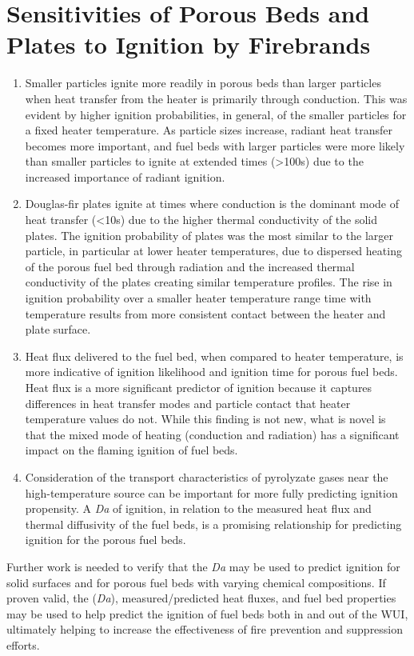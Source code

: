 \section{Sensitivities of Porous Beds and Plates to Ignition by Firebrands}
        \begin{enumerate}
            \item 
                Smaller particles ignite more readily in porous beds than larger particles when heat transfer from the heater is primarily through conduction. This was evident by higher ignition probabilities, in general, of the smaller particles for a fixed heater temperature. As particle sizes increase, radiant heat transfer becomes more important, and fuel beds with larger particles were more likely than smaller particles to ignite at extended times (\textgreater 100\si{\second}) due to the increased importance of radiant ignition. 
            \item
                Douglas-fir plates ignite at times where conduction is the dominant mode of heat transfer (\textless 10\si{\second}) due to the higher thermal conductivity of the solid plates. The ignition probability of plates was the most similar to the larger particle, in particular at lower heater temperatures, due to dispersed heating of the porous fuel bed through radiation and the increased thermal conductivity of the plates creating similar temperature profiles. The rise in ignition probability over a smaller heater temperature range time with temperature results from more consistent contact between the heater and plate surface.
            \item 
                Heat flux delivered to the fuel bed, when compared to heater temperature, is more indicative of ignition likelihood and ignition time for porous fuel beds. Heat flux is a more significant predictor of ignition because it captures differences in heat transfer modes and particle contact that heater temperature values do not. While this finding is not new, what is novel is that the mixed mode of heating (conduction and radiation) has a significant impact on the flaming ignition of fuel beds.
            \item 
                Consideration of the transport characteristics of pyrolyzate gases near the high-temperature source can be important for more fully predicting ignition propensity. A \textit{Da} of ignition, in relation to the measured heat flux and thermal diffusivity of the fuel beds, is a promising relationship for predicting ignition for the porous fuel beds.  
        \end{enumerate}
    Further work is needed to verify that the \textit{Da} may be used to predict ignition for solid surfaces and for porous fuel beds with varying chemical compositions. If proven valid, the (\textit{Da}), measured/predicted heat fluxes, and fuel bed properties may be used to help predict the ignition of fuel beds both in and out of the WUI, ultimately helping to increase the effectiveness of fire prevention and suppression efforts.

